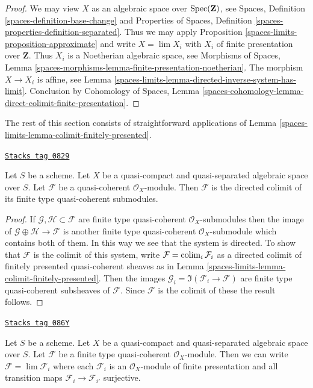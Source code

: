 \begin{proof}
We may view $X$ as an algebraic space over $\operatorname{Spec}(\mathbf{Z})$, see
Spaces, Definition \ref{spaces-definition-base-change} and
Properties of Spaces, Definition \ref{spaces-properties-definition-separated}.
Thus we may apply Proposition \ref{spaces-limits-proposition-approximate}
and write $X = \lim X_i$ with $X_i$ of finite presentation over $\mathbf{Z}$.
Thus $X_i$ is a Noetherian algebraic space, see
Morphisms of Spaces, Lemma
\ref{spaces-morphisms-lemma-finite-presentation-noetherian}.
The morphism $X \to X_i$ is affine, see
Lemma \ref{spaces-limits-lemma-directed-inverse-system-has-limit}.
Conclusion by
Cohomology of Spaces, Lemma
\ref{spaces-cohomology-lemma-direct-colimit-finite-presentation}.
\end{proof}

The rest of this section consists of straightforward
applications of Lemma \ref{spaces-limits-lemma-colimit-finitely-presented}.

\begin{lemma}
\label{spaces-limits-lemma-directed-colimit-finite-type}
\href{https://stacks.math.columbia.edu/tag/0829}{\texttt{Stacks tag 0829}}

Let $S$ be a scheme. Let $X$ be a quasi-compact and quasi-separated
algebraic space over $S$.
Let $\mathcal{F}$ be a quasi-coherent $\mathcal{O}_X$-module.
Then $\mathcal{F}$ is the directed colimit of its finite type
quasi-coherent submodules.
\end{lemma}

\begin{proof}
If $\mathcal{G}, \mathcal{H} \subset \mathcal{F}$ are finite type
quasi-coherent $\mathcal{O}_X$-submodules then the image
of $\mathcal{G} \oplus \mathcal{H} \to \mathcal{F}$ is another
finite type quasi-coherent $\mathcal{O}_X$-submodule which contains
both of them. In this way we see that the system is directed.
To show that $\mathcal{F}$ is the colimit of this system, write
$\mathcal{F} = \operatorname{colim}_i \mathcal{F}_i$ as a directed
colimit of finitely presented quasi-coherent sheaves as in
Lemma \ref{spaces-limits-lemma-colimit-finitely-presented}.
Then the images $\mathcal{G}_i = \Im(\mathcal{F}_i \to \mathcal{F})$ are
finite type quasi-coherent subsheaves of $\mathcal{F}$. Since
$\mathcal{F}$ is the colimit of these the result follows.
\end{proof}

\begin{lemma}
\label{spaces-limits-lemma-finite-directed-colimit-surjective-maps}
\href{https://stacks.math.columbia.edu/tag/086Y}{\texttt{Stacks tag 086Y}}

Let $S$ be a scheme. Let $X$ be a quasi-compact and quasi-separated
algebraic space over $S$. Let $\mathcal{F}$ be a finite type
quasi-coherent $\mathcal{O}_X$-module. Then we can write
$\mathcal{F} = \lim \mathcal{F}_i$ where each $\mathcal{F}_i$ is an
$\mathcal{O}_X$-module of finite presentation and all transition maps
$\mathcal{F}_i \to \mathcal{F}_{i'}$ surjective.
\end{lemma}

